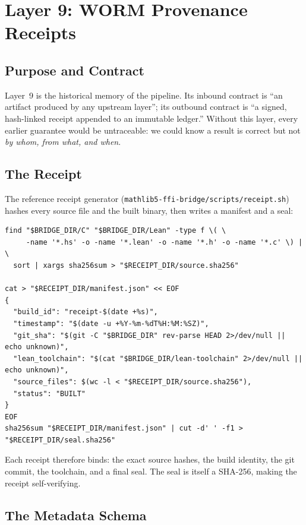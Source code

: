 \chapter{Layer 9: WORM Provenance Receipts}
\label{ch:worm}

\section{Purpose and Contract}
\label{sec:worm-purpose}

Layer~9 is the historical memory of the pipeline. Its inbound contract is
``an artifact produced by any upstream layer''; its outbound contract is ``a
signed, hash-linked receipt appended to an immutable ledger.'' Without this
layer, every earlier guarantee would be untraceable: we could know a result
is correct but not \emph{by whom, from what, and when}.

\section{The Receipt}
\label{sec:worm-receipt}

The reference receipt generator (\texttt{mathlib5-ffi-bridge/scripts/receipt.sh})
hashes every source file and the built binary, then writes a manifest and a
seal:
\begin{lstlisting}[language=BashX,caption={Receipt generation (receipt.sh).},label=lst:worm-receipt]
find "$BRIDGE_DIR/C" "$BRIDGE_DIR/Lean" -type f \( \
     -name '*.hs' -o -name '*.lean' -o -name '*.h' -o -name '*.c' \) | \
  sort | xargs sha256sum > "$RECEIPT_DIR/source.sha256"

cat > "$RECEIPT_DIR/manifest.json" << EOF
{
  "build_id": "receipt-$(date +%s)",
  "timestamp": "$(date -u +%Y-%m-%dT%H:%M:%SZ)",
  "git_sha": "$(git -C "$BRIDGE_DIR" rev-parse HEAD 2>/dev/null || echo unknown)",
  "lean_toolchain": "$(cat "$BRIDGE_DIR/lean-toolchain" 2>/dev/null || echo unknown)",
  "source_files": $(wc -l < "$RECEIPT_DIR/source.sha256"),
  "status": "BUILT"
}
EOF
sha256sum "$RECEIPT_DIR/manifest.json" | cut -d' ' -f1 > "$RECEIPT_DIR/seal.sha256"
\end{lstlisting}
Each receipt therefore binds: the exact source hashes, the build identity, the
git commit, the toolchain, and a final seal. The seal is itself a SHA-256,
making the receipt self-verifying.

\section{The Metadata Schema}
\label{sec:worm-meta}

